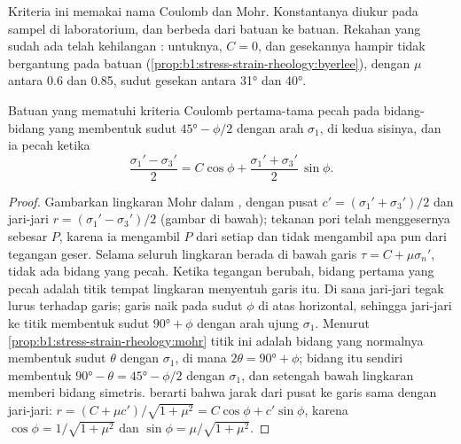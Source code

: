 Kriteria ini memakai nama Coulomb dan Mohr. Konstantanya diukur pada sampel di laboratorium, dan berbeda dari batuan ke batuan. Rekahan yang sudah ada telah kehilangan : untuknya, $C = 0$, dan gesekannya hampir tidak bergantung pada batuan (\cref{prop:b1:stress-strain-rheology:byerlee}), dengan $\mu$ antara 0.6 dan 0.85, sudut gesekan antara \ang{31} dan \ang{40}.

\begin{theorem}\label{thm:b1:stress-strain-rheology:failure-angle}
Batuan yang mematuhi kriteria Coulomb pertama-tama pecah pada bidang-bidang yang membentuk sudut $\ang{45} - \phi/2$ dengan arah $\sigma_1$, di kedua sisinya, dan ia pecah ketika
\[
  \frac{\sigma_1' - \sigma_3'}{2} = C\cos\phi + \frac{\sigma_1' + \sigma_3'}{2}\,\sin\phi .
\]
\end{theorem}

\begin{proof}
Gambarkan lingkaran Mohr dalam , dengan pusat $c' =
(\sigma_1'+\sigma_3')/2$ dan jari-jari $r = (\sigma_1'-\sigma_3')/2$
(gambar di bawah); tekanan pori telah menggesernya sebesar $P$, karena ia mengambil $P$ dari setiap
 dan tidak mengambil apa pun dari tegangan geser. Selama seluruh lingkaran berada di
bawah garis $\tau = C + \mu\sigma_n'$,
tidak ada bidang yang pecah. Ketika tegangan berubah, bidang pertama yang pecah adalah titik tempat
lingkaran menyentuh garis itu. Di sana jari-jari tegak lurus terhadap garis; garis naik pada sudut
$\phi$ di atas horizontal, sehingga jari-jari ke titik  membentuk sudut $\ang{90} + \phi$
dengan arah ujung $\sigma_1$. Menurut \cref{prop:b1:stress-strain-rheology:mohr} titik ini adalah
bidang yang normalnya membentuk sudut $\theta$ dengan $\sigma_1$,
di mana $2\theta = \ang{90} + \phi$; bidang itu sendiri membentuk $\ang{90} - \theta = \ang{45} - \phi/2$
dengan $\sigma_1$, dan setengah bawah lingkaran memberi bidang simetris.  berarti bahwa jarak
dari pusat ke garis sama dengan jari-jari:
$r = (C + \mu c')/\sqrt{1+\mu^2} = C\cos\phi + c'\sin\phi$, karena
$\cos\phi = 1/\sqrt{1+\mu^2}$ dan $\sin\phi = \mu/\sqrt{1+\mu^2}$.
\end{proof}

